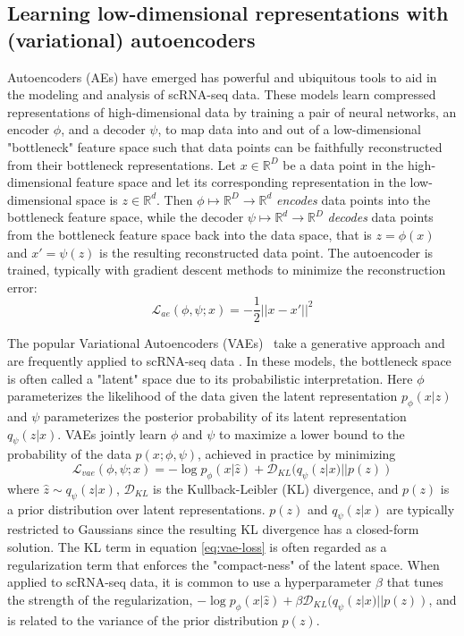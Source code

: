 \subsection{Learning low-dimensional representations with (variational) autoencoders}
Autoencoders (AEs) have emerged has powerful and ubiquitous tools to aid in the modeling and analysis of scRNA-seq data.
These models learn compressed representations of high-dimensional data by training a pair of neural networks, an encoder $\phi$, and a decoder $\psi$,
to map data into and out of a low-dimensional "bottleneck" feature space such that data points can be faithfully reconstructed from their bottleneck representations.
Let $x \in \mathbb{R}^D$ be a data point in the high-dimensional feature space and let its corresponding representation in the low-dimensional space is $z \in \mathbb{R}^d$.
Then $\phi \mapsto \mathbb{R}^D \to \mathbb{R}^d$ \emph{encodes} data points into the bottleneck feature space,
while the decoder $\psi \mapsto \mathbb{R}^d \to \mathbb{R}^D$ \emph{decodes} data points from the bottleneck feature space back into the data space,
that is $z = \phi(x)$ and $x\prime = \psi(z)$ is the resulting reconstructed data point.
The autoencoder is trained, typically with gradient descent methods \cite{kingma2017} to minimize the reconstruction error:
\begin{equation}
  \mathcal{L}_{ae}(\phi, \psi; x) = -\frac{1}{2} || x - x\prime ||^2
\end{equation}

The popular Variational Autoencoders (VAEs)~\citep{kingma2013} take a generative approach and are frequently applied to scRNA-seq data \cite{lopez2018, huang2018, eraslan2019, lotfollahi2019}.
In these models, the bottleneck space is often called a "latent" space due to its probabilistic interpretation.
Here $\phi$ parameterizes the likelihood of the data given the latent representation $p_\phi(x|z)$ and $\psi$ parameterizes the posterior probability of its latent representation $q_\psi(z|x)$.
VAEs jointly learn $\phi$ and $\psi$ to maximize a lower bound to the probability of the data $p(x; \phi, \psi)$, achieved in practice by minimizing
\begin{equation}
    \mathcal{L}_{vae}(\phi, \psi; x) = -\log p_\phi(x | \hat{z}) + \mathcal{D}_{KL}(q_\psi(z|x) || p(z))
    \label{eq:vae-loss}
\end{equation}
where $\hat{z} \sim q_\psi(z|x)$, $\mathcal{D}_{KL}$ is the Kullback-Leibler (KL) divergence,
and $p(z)$ is a prior distribution over latent representations.
$p(z)$ and $q_\psi(z|x)$ are typically restricted to Gaussians since the resulting KL divergence has a closed-form solution.
The KL term in equation \ref{eq:vae-loss} is often regarded as a regularization term that enforces the "compact-ness" of the latent space.
When applied to scRNA-seq data, it is common to use a hyperparameter $\beta$ that tunes the strength of the regularization, 
$-\log p_\phi(x | \hat{z}) + \beta \mathcal{D}_{KL}(q_\psi(z|x) || p(z))$,
and is related to the variance of the prior distribution $p(z)$.

